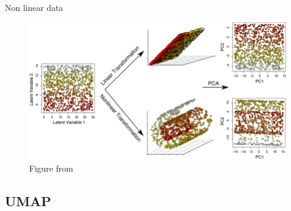 \documentclass{irdbeamer}
\let\oldcite=\cite
\renewcommand{\cite}[1]{\textcolor[rgb]{.5,.5,.7}{\oldcite{#1}}}
\begin{document}
\begin{frame}{Non linear data}
    \begin{figure}
    \centering
    \includegraphics[width=.7\textwidth]{./figs/non_linearity.png}
    \caption{\tiny Figure from \cite{du2019dimensionality}}
        
    \end{figure}
\end{frame}

\subsection{UMAP}



%         
%         

%         
%         
\end{document}
